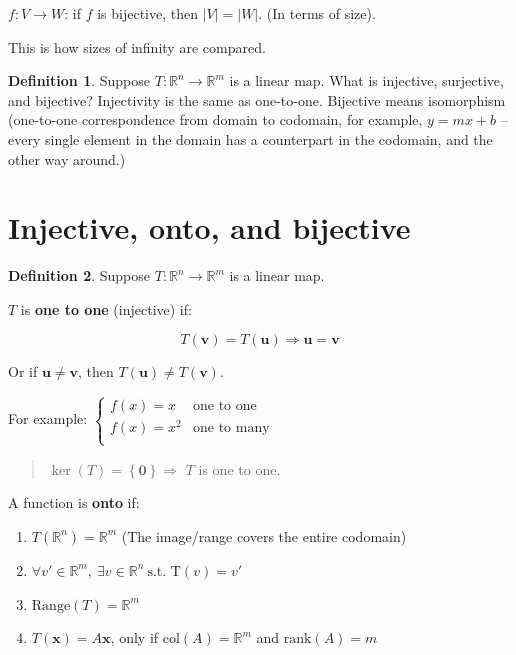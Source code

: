 \documentclass[12pt]{article}
\theoremstyle{plain}
\theoremstyle{remark}
\theoremstyle{definition}
\newtheorem{definition}{Definition}[section]
\begin{document}
\(f:V \rightarrow W\): if \(f\) is bijective, then \(|V| = |W|\). (In
terms of size).


This is how sizes of infinity are compared.

\begin{definition}
Suppose
\(T:\mathbb{R}^{n} \rightarrow \mathbb{R}^{m}\) is a linear map. What is
injective, surjective, and bijective? Injectivity is the same as
one-to-one. Bijective means isomorphism (one-to-one correspondence from
domain to codomain, for example, \(y = mx + b\) -- every single element
in the domain has a counterpart in the codomain, and the other way
around.)
\end{definition}


\section{\texorpdfstring{ Injective, onto, and
bijective}{ Injective, onto, and bijective}}

\begin{definition}
Suppose
\(T:\mathbb{R}^{n} \rightarrow \mathbb{R}^{m}\) is a linear map.
\end{definition}

\(T\) is \textbf{one to one} (injective) if:

\[T\left( \mathbf{v} \right) = T\left( \mathbf{u} \right) \Rightarrow \mathbf{u} = \mathbf{v}\]

Or if \(\mathbf{u} \neq \mathbf{v}\), then
\(T(\mathbf{u}) \neq T\left( \mathbf{v} \right)\).

For example: \(\left\{ \begin{matrix}
f(x) = x & \text{one\ to\ one} \\
f(x) = x^{2} & \text{one\ to\ many} \\
\end{matrix} \right.\ \)

\begin{quote}
\(\ker(T) = \left\{ \mathbf{0} \right\} \Rightarrow\) \(T\) is one
to one.
\end{quote}

A function is \textbf{onto} if:

\begin{enumerate}
\def\labelenumi{\roman{enumi})}
\item
  \(T\left( \mathbb{R}^{n} \right) = \mathbb{R}^{m}\) (The image/range
  covers the entire codomain)
\item
  \(\forall v' \in \mathbb{R}^{m},\ \exists v \in \mathbb{R}^{n}\ \text{s.t.}\text{\ T}(v) = v'\)
\item
  \(\text{Range}(T) = \mathbb{R}^{m}\)
\item
  \(T\left( \mathbf{x} \right) = A\mathbf{x}\), only if
  \(\text{col}(A) = \mathbb{R}^{m}\) and \(\text{rank}{(A)} = m\)
\end{enumerate}
\end{document}
